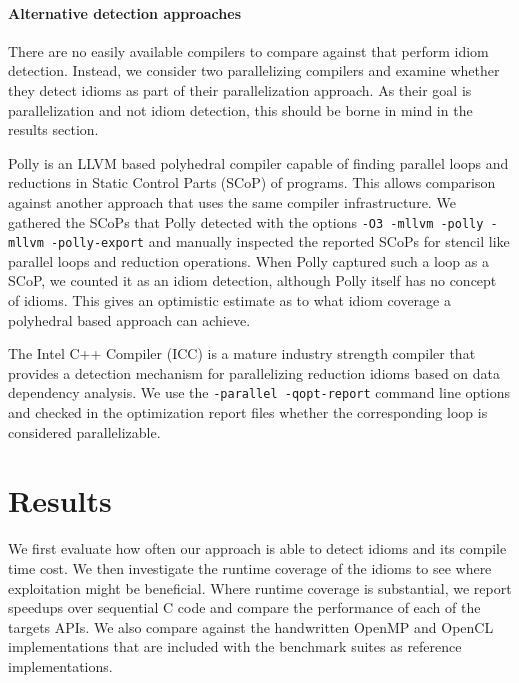     \paragraph*{Alternative detection approaches}
    \hspace{0.2cm}There are no easily available compilers to compare against
    that perform idiom detection.
    Instead, we consider two parallelizing compilers and examine
    whether they detect idioms as part of their parallelization approach.
    As their goal is parallelization and not idiom detection, this should be
    borne in mind in the results section.

    Polly \cite{Doerfert2015Polly} is an LLVM based polyhedral compiler
    capable of finding parallel loops and reductions in Static Control
    Parts (SCoP) of programs.  This allows comparison against
    another approach that uses the same compiler infrastructure.
    We gathered the SCoPs that Polly detected with the options
    \texttt{-O3 -mllvm -polly -mllvm -polly-export} and manually inspected
    the reported SCoPs for stencil like parallel loops and reduction operations.
    When Polly captured such a loop as a SCoP, we counted it as an idiom
    detection, although Polly itself has no concept of idioms.
    This gives an optimistic estimate as to what idiom coverage a polyhedral
    based approach can achieve.

    The Intel C++ Compiler (ICC) is a mature industry strength compiler that
    provides a detection mechanism for parallelizing reduction idioms based on
    data dependency analysis.
    We use the \texttt{-parallel -qopt-report} command line options and checked
    in the optimization report files whether the corresponding loop is
    considered parallelizable.

\newpage

\section{Results}
\label{sec:idiomresults}

    We first evaluate how often our approach is able to detect idioms and its
    compile time cost.
    We then investigate the runtime coverage of the idioms to see where
    exploitation might be beneficial.
    Where runtime coverage is substantial, we report speedups over sequential C
    code and compare the performance of each of the targets APIs.
    We also compare against the handwritten OpenMP and OpenCL implementations
    that are included with the benchmark suites as reference implementations.

